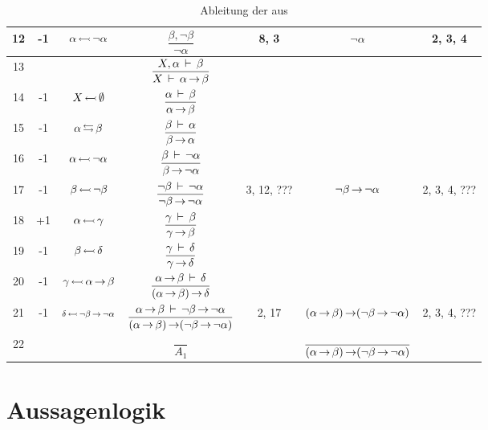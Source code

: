 \begin{table}[!htb]
\begin{tabular}{|c||c|c|c|c|c|c|}
		12 & -1 & $\alpha \subst \lnot\alpha$ & $\dfrac{\beta, \lnot\beta} {\lnot\alpha}$ & 8, 3 & $\lnot\alpha$ & 2, 3, 4
		\\\hline
		13 & \tagimpE & & $\dfrac{X, \alpha \derive \beta}{X \derive \alpha\limp\beta}$ & & &
		\\\hline
		14 & -1 & $X \subst \emptyset$ & $\dfrac{\alpha \derive \beta}{\alpha\limp\beta}$ & & &
		\\\hline
		15 & -1 & $\alpha \change \beta$ & $\dfrac{\beta \derive \alpha} {\beta\limp\alpha}$ & & &
		\\\hline
		16 & -1 & $\alpha \subst \lnot\alpha$ & $\dfrac{\beta \derive \lnot\alpha} {\beta\limp\lnot\alpha}$ & & & \tagimpE
		\\\hline
		17 & -1 & $\beta \subst \lnot\beta$ & $\dfrac{\lnot\beta \derive \lnot\alpha}{\lnot\beta\limp\lnot\alpha}$ & 3, 12, ??? & $\lnot\beta\limp\lnot\alpha$ & 2, 3, 4, ???
		\\\hline
		18 & \tagimpE+1 & $\alpha \subst \gamma$ & $\dfrac{\gamma \derive \beta} {\gamma\limp\beta}$ & & & \tagimpE
		\\\hline
		19 & -1 & $\beta \subst \delta$ & $\dfrac{\gamma \derive \delta} {\gamma\limp\delta}$ & & & \tagimpE
		\\\hline
		20 & -1 & $\gamma \subst \alpha\limp\beta$ & $\dfrac{\alpha\limp\beta \derive \delta} {(\alpha\limp\beta)\limp\delta}$ & & & \tagimpE
		\\\hline
		21 & -1 & $\scriptstyle\delta \subst \lnot\beta\limp\lnot\alpha$ & $\dfrac{\alpha\limp\beta \derive \lnot\beta\limp\lnot\alpha}
		{(\alpha\limp\beta)\limp(\lnot\beta\limp\lnot\alpha)}$ & 2, 17 &
		$(\alpha\limp\beta)\limp(\lnot\beta\limp\lnot\alpha)$ & 2, 3, 4, ???
		\\\hline\hline
		22 & \centerParbox[1.5cm]{\tagimpE, \tagimpB, \tagSR} & & $\dfrac{}{A_1}$ & & $\dfrac{}{(\alpha\limp\beta)\limp(\lnot\beta\limp\lnot\alpha)}$ &
		\\\hline
	\end{tabular}
	\caption{Ableitung der  aus }
	\label{tab:AbleitungKontraposition}
\end{table}


\section{Aussagenlogik}%
\label{sec:Aussagenlogik}

